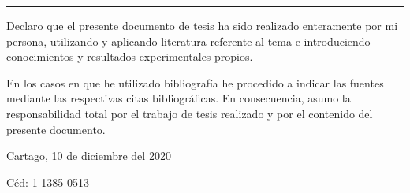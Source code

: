 \thispagestyle{empty}

\rule{10mm}{0pt}

\vfill

Declaro que el presente documento de tesis ha sido realizado enteramente
por mi persona, utilizando y aplicando literatura referente al tema e
introduciendo conocimientos y resultados experimentales propios.

En los casos en que he utilizado bibliografía he procedido a indicar las
fuentes mediante las respectivas citas bibliográficas.  En consecuencia,
asumo la responsabilidad total por el trabajo de tesis realizado y por
el contenido del presente documento.



\vspace*{8mm}

\begin{flushright}
  \scriptAuthor\par
  Cartago, 10 de diciembre del 2020\par
  Céd: 1-1385-0513
\end{flushright}

\vspace*{8mm}

\begin{center}
  \doclicenseThis
\end{center}

\cleardoublepage

